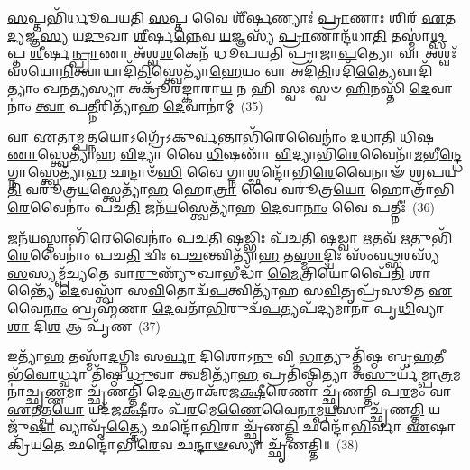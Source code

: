 {\anuvakamend[{𑌤𑍇\-\ul{𑌨𑍈}\-𑌵 𑌲𑍋𑌮᳴\-\ul{𑌭𑌿𑌃} 𑌸\-\ul{𑌮𑍇}\-𑌤𑍇 𑌅᳴\-\ul{𑌭𑌿}\-𑌚𑌰᳴\-\ul{𑌤} 𑌏𑌕᳴𑌵𑌿𑍞𑌶𑌤𑌿𑌶𑍍𑌚}]}%

\-\ul{𑌸}\-𑌪𑍍𑌤𑌭𑌿᳴𑌰𑍍𑌧𑍂𑌪𑌯𑌤𑌿 \ul{𑌸}\-𑌪𑍍𑌤 𑌵𑍈 𑌶𑍀᳴𑌰𑍍\mbox{}\-\ul{𑌷}\-𑌣𑍍𑌯𑌾𑌃॑ \ul{𑌪𑍍𑌰𑌾}\-𑌣𑌾𑌃 𑌶𑌿𑌰᳴ \ul{𑌏}\-𑌤\-\ul{𑌦𑍍𑌯}\-𑌜𑍍𑌞\-\ul{𑌸𑍍𑌯} 𑌯\-\ul{𑌦𑍁}\-𑌖𑌾 \ul{𑌶𑍀}\-𑌰𑍍\mbox{}𑌷\-\ul{𑌨𑍍𑌨𑍇}\-𑌵 \ul{𑌯}\-𑌜𑍍𑌞𑌸𑍍𑌯᳴ \ul{𑌪𑍍𑌰𑌾}\-𑌣𑌾𑌨𑍍𑌦᳴𑌧𑌾\-\ul{𑌤𑌿} 𑌤𑌸𑍍𑌮𑌾॑\-\ul{𑌥𑍍𑌸}\-𑌪𑍍𑌤 \ul{𑌶𑍀}\-𑌰𑍍\mbox{}𑌷\-\ul{𑌨𑍍𑌪𑍍𑌰𑌾}\-𑌣𑌾 𑌅᳴𑌶𑍍𑌵\-\ul{𑌶}\-𑌕𑍇𑌨᳴ 𑌧𑍂𑌪𑌯𑌤𑌿 𑌪𑍍𑌰𑌾𑌜𑌾\-\ul{𑌪}\-𑌤𑍍𑌯𑍋 𑌵𑌾 𑌅𑌶𑍍𑌵𑌃᳴ 𑌸𑌯𑍋\-\ul{𑌨𑌿}\-𑌤𑍍𑌵𑌾𑌯𑌾𑌦𑌿᳴\-\ul{𑌤𑌿}\-𑌸𑍍𑌤𑍍𑌵𑍇𑌤𑍍𑌯𑌾᳴\-\ul{𑌹𑍇}\-𑌯𑌂 𑌵𑌾 𑌅𑌦𑌿᳴\-\ul{𑌤𑌿}\-𑌰𑌦𑌿᳴\-\ul{𑌤𑍍𑌯𑍈}\-𑌵𑌾𑌦𑌿᳴𑌤𑍍𑌯𑌾𑌂 𑌖𑌨\-\ul{𑌤𑍍𑌯}\-𑌸𑍍𑌯𑌾 𑌅𑌕𑍍𑌰𑍂᳴𑌰𑌙𑍍𑌕𑌾𑌰𑌾\-\ul{𑌯} 𑌨 𑌹𑌿 𑌸𑍍𑌵𑌃 𑌸𑍍𑌵𑍞 \ul{𑌹𑌿}\-𑌨𑌸𑍍𑌤𑌿᳴ \ul{𑌦𑍇}\-𑌵𑌾𑌨𑌾𑌂॑ \ul{𑌤𑍍𑌵𑌾} 𑌪\-\ul{𑌤𑍍𑌨𑍀}\-𑌰𑌿𑌤𑍍𑌯𑌾᳴𑌹 \ul{𑌦𑍇}\-𑌵𑌾𑌨𑌾॑𑌮𑍍~(35)

𑌵𑌾 \ul{𑌏}\-𑌤𑌾𑌮𑍍𑌪\-\ul{𑌤𑍍𑌨}\-𑌯𑍋\-𑌽𑌗𑍍𑌰𑍇᳴\-𑌽𑌕𑍁\-\ul{𑌰𑍍𑌵}\-𑌨𑍍𑌤𑌾𑌭𑌿᳴\-\ul{𑌰𑍇}\-𑌵𑍈𑌨𑌾𑌂॑ 𑌦𑌧𑌾𑌤𑌿 \ul{𑌧𑌿}\-𑌷\-\ul{𑌣𑌾}\-𑌸𑍍𑌤𑍍𑌵𑍇𑌤𑍍𑌯𑌾᳴𑌹 \ul{𑌵𑌿}\-𑌦𑍍𑌯𑌾 𑌵𑍈 \ul{𑌧𑌿}\-𑌷𑌣𑌾᳴ \ul{𑌵𑌿}\-𑌦𑍍𑌯𑌾𑌭𑌿᳴\-\ul{𑌰𑍇}\-𑌵𑍈𑌨𑌾᳴\-\ul{𑌮}\-𑌭𑍀\-\ul{𑌨𑍍𑌦𑍍𑌧𑍇} 𑌗𑍍𑌨𑌾𑌸𑍍𑌤𑍍𑌵𑍇𑌤𑍍𑌯𑌾᳴\-\ul{𑌹} 𑌛𑌨𑍍𑌦𑌾𑍞᳴\-\ul{𑌸𑌿} 𑌵𑍈 𑌗𑍍𑌨𑌾𑌶𑍍𑌛𑌨𑍍𑌦𑍋᳴𑌭𑌿\-\ul{𑌰𑍇}\-𑌵𑍈𑌨𑌾𑍟᳴ 𑌶𑍍𑌰𑌪𑌯\-\ul{𑌤𑌿} 𑌵𑌰𑍂॑𑌤𑍍𑌰\-\ul{𑌯}\-𑌸𑍍𑌤𑍍𑌵𑍇𑌤𑍍𑌯𑌾᳴\-\ul{𑌹} 𑌹𑍋\-\ul{𑌤𑍍𑌰𑌾} 𑌵𑍈 𑌵𑌰𑍂॑𑌤𑍍𑌰\-\ul{𑌯𑍋} 𑌹𑍋𑌤𑍍𑌰𑌾᳴𑌭𑌿\-\ul{𑌰𑍇}\-𑌵𑍈𑌨𑌾𑌂॑ 𑌪𑌚\-\ul{𑌤𑌿} 𑌜𑌨᳴\-\ul{𑌯}\-𑌸𑍍𑌤𑍍𑌵𑍇𑌤𑍍𑌯𑌾᳴𑌹 \ul{𑌦𑍇}\-𑌵𑌾\-\ul{𑌨𑌾𑌂} 𑌵𑍈 𑌪𑌤𑍍𑌨𑍀𑌃॑~(36)

𑌜𑌨᳴\-\ul{𑌯}\-𑌸𑍍𑌤𑌾𑌭𑌿᳴\-\ul{𑌰𑍇}\-𑌵𑍈𑌨𑌾𑌂॑ 𑌪𑌚𑌤𑌿 \ul{𑌷}\-𑌡𑍍𑌭𑌿𑌃 𑌪᳴𑌚\-\ul{𑌤𑌿} 𑌷𑌡𑍍𑌵𑌾 \ul{𑌋}\-𑌤𑌵᳴ \ul{𑌋}\-𑌤𑍁𑌭𑌿᳴\-\ul{𑌰𑍇}\-𑌵𑍈𑌨𑌾𑌂॑ 𑌪𑌚\-\ul{𑌤𑌿} 𑌦𑍍𑌵𑌿𑌃 𑌪\-\ul{𑌚}\-𑌨𑍍𑌤𑍍𑌵𑌿𑌤𑍍𑌯𑌾᳴\-\ul{𑌹} 𑌤\-\ul{𑌸𑍍𑌮𑌾}\-𑌦𑍍𑌦𑍍𑌵𑌿𑌃 𑌸𑌂᳴𑌵\-\ul{𑌥𑍍𑌸}\-𑌰𑌸𑍍𑌯᳴ \ul{𑌸}\-𑌸𑍍𑌯𑌮𑍍𑌪᳴𑌚𑍍𑌯𑌤𑍇 𑌵𑌾\-\ul{𑌰𑍁}\-𑌣𑍍𑌯𑍁᳴𑌖𑌾𑌭𑍀𑌦𑍍𑌧𑌾᳴ \ul{𑌮𑍈}\-𑌤𑍍𑌰𑌿𑌯𑍋𑌪𑍈᳴\-\ul{𑌤𑌿} 𑌶𑌾𑌨𑍍𑌤𑍍𑌯𑍈᳴ \ul{𑌦𑍇}\-𑌵𑌸𑍍𑌤𑍍𑌵𑌾᳴ 𑌸\-\ul{𑌵𑌿}\-𑌤𑍋𑌦𑍍𑌵᳴\-\ul{𑌪}\-𑌤𑍍𑌵𑌿𑌤𑍍𑌯𑌾᳴𑌹 𑌸\-\ul{𑌵𑌿}\-𑌤𑍃𑌪𑍍𑌰᳴𑌸𑍂𑌤 \ul{𑌏}\-𑌵𑍈\-\ul{𑌨𑌾𑌂} 𑌬𑍍𑌰𑌹𑍍𑌮᳴𑌣𑌾 \ul{𑌦𑍇}\-𑌵𑌤𑌾᳴\-\ul{𑌭𑌿}\-𑌰𑍁𑌦𑍍𑌵᳴\-\ul{𑌪}\-𑌤𑍍𑌯𑌪᳴𑌦𑍍𑌯𑌮𑌾𑌨𑌾 𑌪𑍃\-\ul{𑌥𑌿}\-𑌵𑍍𑌯𑌾\-\ul{𑌶𑌾} 𑌦𑌿\-\ul{𑌶} 𑌆 𑌪𑍃᳴𑌣~(37)

𑌇𑌤𑍍𑌯𑌾᳴\-\ul{𑌹} 𑌤𑌸𑍍𑌮𑌾᳴\-\ul{𑌦}\-𑌗𑍍𑌨𑌿𑌃 𑌸\-\ul{𑌰𑍍𑌵𑌾} 𑌦𑌿𑌶𑍋\-𑌽\-\ul{𑌨𑍁} 𑌵𑌿 \ul{𑌭𑌾}\-𑌤𑍍𑌯𑍁𑌤𑍍𑌤𑌿᳴𑌷𑍍𑌠 𑌬𑍃\-\ul{𑌹}\-𑌤𑍀 𑌭᳴\-\ul{𑌵𑍋}\-𑌰𑍍𑌧𑍍𑌵𑌾 𑌤𑌿᳴𑌷𑍍𑌠 \ul{𑌧𑍍𑌰𑍁}\-𑌵𑌾 𑌤𑍍𑌵𑌮𑌿𑌤𑍍𑌯𑌾᳴\-\ul{𑌹} 𑌪𑍍𑌰𑌤𑌿᳴𑌷𑍍𑌠𑌿𑌤𑍍𑌯𑌾 𑌅\-\ul{𑌸𑍁}\-𑌰𑍍𑌯᳴𑌮𑍍𑌪𑌾\-\ul{𑌤𑍍𑌰}\-\-𑌮𑌨𑌾॑𑌚𑍍𑌛𑍃\-\ul{𑌣𑍍𑌣}\-𑌮𑌾 𑌚𑍍𑌛𑍃᳴𑌣𑌤𑍍𑌤𑌿 𑌦𑍇\-\ul{𑌵}\-𑌤𑍍𑌰𑌾𑌕᳴𑌰𑌜\-\ul{𑌕𑍍𑌷𑍀}\-𑌰𑍇𑌣𑌾 𑌚𑍍𑌛𑍃᳴𑌣𑌤𑍍𑌤𑌿 𑌪\-\ul{𑌰}\-𑌮𑌂 𑌵𑌾 \ul{𑌏}\-𑌤𑌤𑍍𑌪\-\ul{𑌯𑍋} 𑌯𑌦᳴𑌜\-\ul{𑌕𑍍𑌷𑍀}\-𑌰𑌂 𑌪᳴\-\ul{𑌰}\-𑌮𑍇\-\ul{𑌣𑍈}\-𑌵𑍈\-\ul{𑌨𑌾}\-𑌮𑍍𑌪\-\ul{𑌯}\-𑌸𑌾 𑌚𑍍𑌛𑍃᳴𑌣\-\ul{𑌤𑍍𑌤𑌿} 𑌯𑌜𑍁᳴\-\ul{𑌷𑌾} 𑌵𑍍𑌯𑌾𑌵𑍃᳴\-\ul{𑌤𑍍𑌤𑍍𑌯𑍈} 𑌛𑌨𑍍𑌦𑍋᳴\-\ul{𑌭𑌿}\-𑌰𑌾 𑌚𑍍𑌛𑍃᳴𑌣\-\ul{𑌤𑍍𑌤𑌿} 𑌛𑌨𑍍𑌦𑍋᳴\-\ul{𑌭𑌿}\-𑌰𑍍𑌵𑌾 \ul{𑌏}\-𑌷𑌾 𑌕𑍍𑌰𑌿᳴𑌯\-\ul{𑌤𑍇} 𑌛𑌨𑍍𑌦𑍋᳴𑌭𑌿\-\ul{𑌰𑍇}\-𑌵 𑌛\-\ul{𑌨𑍍𑌦𑌾}\-\-\ul{𑍟}\-𑌸𑍍𑌯𑌾 𑌚𑍍𑌛𑍃᳴𑌣𑌤𑍍𑌤𑌿॥~(38)

{\anuvakamend[{\-\ul{𑌆}\-\-\ul{𑌹} \ul{𑌦𑍇}\-𑌵𑌾\-\ul{𑌨𑌾𑌂} 𑌵𑍈 𑌪𑌤𑍍𑌨𑍀𑌃॑ 𑌪𑍃\-\ul{𑌣𑍈}\-𑌷𑌾 𑌷𑌟𑍍𑌚᳴}]}%

